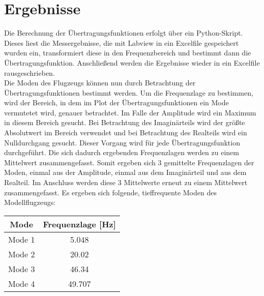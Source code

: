 \section{Ergebnisse}
    Die Berechnung der Übertragungsfunktionen erfolgt über ein Python-Skript.
    Dieses liest die Messergebnisse, die mit Labview in ein  Excelfile
    gespeichert wurden ein, transformiert diese in den Frequenzbereich und
    bestimmt dann die Übertragungsfunktion. Anschließend werden die Ergebnisse
    wieder in ein Excelfile rausgeschrieben.
    \\

    \noindent
    Die Moden des Flugzeugs können nun durch Betrachtung der
    Übertragungsfunktionen bestimmt werden. Um die Frequenzlage zu bestimmen,
    wird der Bereich, in dem im Plot der Übertragungsfunktionen ein Mode
    vermutetet wird, genauer betrachtet. Im Falle der Amplitude wird ein
    Maximum in diesem Bereich gesucht. Bei Betrachtung des Imaginärteils wird der
    größte Absolutwert im Bereich verwendet und bei Betrachtung des Realteils
    wird ein Nulldurchgang gesucht. Dieser Vorgang wird für jede
    Übertragungsfunktion durchgeführt. Die sich dadurch ergebenden
    Frequenzlagen werden zu einem Mittelwert zusammengefasst. Somit ergeben sich
    3 gemittelte Frequenzlagen der Moden, einmal aus der Amplitude, einmal aus 
    dem Imaginärteil und aus dem Realteil. Im Anschluss werden diese 3
    Mittelwerte erneut zu einem Mittelwert zusammengefasst. Es ergeben sich
    folgende, tieffrequente Moden des Modellflugzeugs:

    \begin{table}[H]
        \centering
        \begin{tabular}{|c|c|}
            \hline
            \textbf{Mode}   &   \textbf{Frequenzlage [Hz]}  \\
            \hline \hline
            Mode 1  &   5.048 \\
            \hline
            Mode 2  &   20.02 \\
            \hline
            Mode 3  &   46.34 \\
            \hline
            Mode 4  &   49.707 \\
            \hline            
        \end{tabular}
    \end{table}